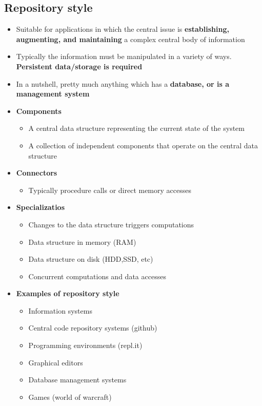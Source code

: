 \documentclass[12pt]{book}
\begin{document}
\subsection{Repository style}
\begin{itemize}
    \item Suitable for applications in which the central issue is \textbf{establishing, augmenting, and maintaining} a complex central body of information
    \item Typically the information must be manipulated in a variety of ways. \textbf{Persistent data/storage is required}
    \item In a nutshell, pretty much anything which has a \textbf{database, or is a management system}
    
    \item \textbf{Components}
    \begin{itemize}
        \item A central data structure representing the current state of the system
        \item A collection of independent components that operate on the central data structure
    \end{itemize} 

    \item \textbf{Connectors}
    \begin{itemize}
        \item Typically procedure calls or direct memory accesses
    \end{itemize} 

    \item \textbf{Specializatios}
    \begin{itemize}
        \item Changes to the data structure triggers computations
        \item Data structure in memory (RAM)
        \item Data structure on disk (HDD,SSD, etc)
        \item Concurrent computations and data accesses
    \end{itemize}

    \item \textbf{Examples of repository style}
    \begin{itemize}
        \item Information systems
        \item Central code repository systems (github)
        \item Programming environments (repl.it)
        \item Graphical editors
        \item Database management systems
        \item Games (world of warcraft)
    \end{itemize} 


\end{itemize}
\end{document}
